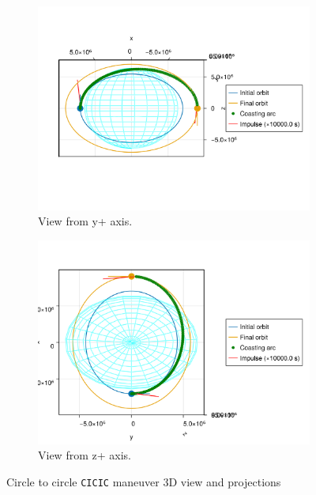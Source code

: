 \begin{figure}[htbp]
\begin{subfigure}{0.49\linewidth}
        \includegraphics[width=\linewidth]{../results/j2/hohmann/CICIC_y+.png}
        \caption{View from y+ axis.}
    \end{subfigure}
    \begin{subfigure}{0.49\linewidth}
        \includegraphics[width=\linewidth]{../results/j2/hohmann/CICIC_z+.png}
        \caption{View from z+ axis.}
    \end{subfigure}
    \caption{Circle to circle \texttt{CICIC} maneuver 3D view and projections}
    \label{fig:j2_c2c_CICIC_figs}
\end{figure}

